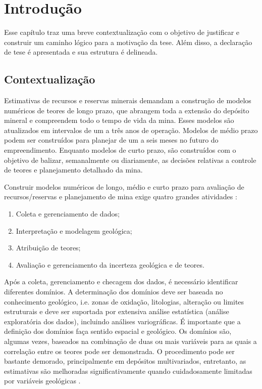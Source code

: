 \chapter{Introdução}

Esse capítulo traz uma breve contextualização com o objetivo de justificar e construir um caminho lógico para a motivação da tese. Além disso, a declaração de tese é apresentada e sua estrutura é delineada.

\section{Contextualização}

Estimativas de recursos e reservas minerais demandam a construção de modelos numéricos de teores de longo prazo, que abrangem toda a extensão do depósito mineral e compreendem todo o tempo de vida da mina. Esses modelos são atualizados em intervalos de um a três anos de operação. Modelos de médio prazo podem ser construídos para planejar de um a seis meses no futuro do empreendimento. Enquanto modelos de curto prazo, são construídos com o objetivo de balizar, semanalmente ou diariamente, as decisões relativas a controle de teores e planejamento detalhado da mina.

Construir modelos numéricos de longo, médio e curto prazo para avaliação de recursos/reservas e planejamento de mina exige quatro grandes atividades \cite{rossi2013mineral}:

\begin{enumerate}[label=\roman*]
\item Coleta e gerenciamento de dados;
\item Interpretação e modelagem geológica;
\item Atribuição de teores;
\item Avaliação e gerenciamento da incerteza geológica e de teores.
\end{enumerate}

Após a coleta, gerenciamento e checagem dos dados, é necessário identificar diferentes domínios. A determinação dos domínios deve ser baseada no conhecimento geológico, i.e. zonas de oxidação, litologias, alteração ou limites estruturais e deve ser suportada por extensiva análise estatística (análise exploratória dos dados), incluindo análises variográficas. É importante que a definição dos domínios faça sentido espacial e geológico. Os domínios são, algumas vezes, baseados na combinação de duas ou mais variáveis para as quais a correlação entre os teores pode ser demonstrada. O procedimento pode ser bastante demorado, principalmente em depósitos multivariados, entretanto, as estimativas são melhoradas significativamente quando cuidadosamente limitadas por variáveis geológicas \cite{rossi2013mineral}.

